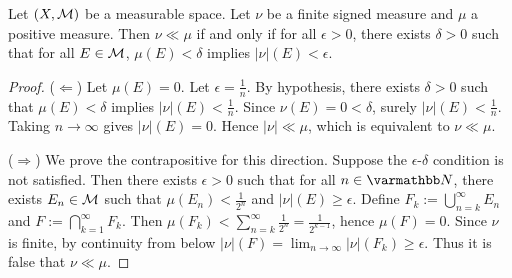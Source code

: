 \begin{proposition}
Let $(X,\mathcal{M})$ be a measurable space. Let $\nu$ be a finite signed measure and $\mu$ a positive measure. Then $\nu \ll \mu$ if and only if for all $\epsilon > 0$, there exists $\delta > 0$ such that for all $E \in \mathcal{M}$, $\mu(E) < \delta$ implies $|\nu|(E) < \epsilon$.
\end{proposition}
    \begin{proof}
        ($\Leftarrow$) Let $\mu(E) = 0$. Let $\epsilon = \frac{1}{n}$. By hypothesis, there exists $\delta > 0$ such that $\mu(E) < \delta$ implies $|\nu|(E) < \frac{1}{n}$. Since $\nu(E) = 0 < \delta$, surely $|\nu|(E) < \frac{1}{n}$. Taking $n \rightarrow \infty$ gives $|\nu|(E) = 0$. Hence $|\nu| \ll \mu$, which is equivalent to $\nu \ll \mu$.

        ($\Rightarrow$) We prove the contrapositive for this direction. Suppose the $\epsilon$-$\delta$ condition is not satisfied. Then there exists $\epsilon > 0$ such that for all $n \in \bfN$, there exists $E_n \in \mathcal{M}$ such that $\mu(E_n) < \frac{1}{2^n}$ and $|\nu|(E) \geq \epsilon$. Define $F_k := \bigcup_{n = k}^\infty E_n$ and $F := \bigcap_{k = 1}^\infty F_k$. Then $\mu(F_k) < \sum_{n = k}^\infty \frac{1}{2^n} = \frac{1}{2^{k-1}}$, hence $\mu(F) = 0$. Since $\nu$ is finite, by continuity from below $|\nu|(F) = \lim_{n \rightarrow \infty}|\nu|(F_k) \geq \epsilon$. Thus it is false that $\nu \ll \mu$.
    \end{proof}

